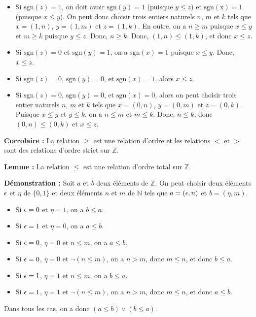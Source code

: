 \begin{itemize}[nosep]
\begin{itemize}[nosep]
            \item Si $\mathrm{sgn}(z) = 1$, on doit avoir $\mathrm{sgn}(y) = 1$ (puisque $y \leq z$) et $\mathrm{sgn(x)} = 1$ (puisque $x \leq y$). 
                On peut donc choisir trois entiers naturels $n$, $m$ et $k$ tels que $x = (1,n)$, $y = (1,m)$ et $z = (1,k)$. 
                En outre, on a $n \geq m$ puisque $x \leq y$ et $m \geq k$ puisque $y \leq z$. 
                Donc, $n \geq k$. 
                Donc, $(1,n) \leq (1,k)$, et donc $x \leq z$.
            \item Si $\mathrm{sgn}(z) = 0$ et $\mathrm{sgn}(y) = 1$, on a $\mathrm{sgn}(x) = 1$ puisque $x \leq y$.
                Donc, $x \leq z$.
            \item Si $\mathrm{sgn}(z) = 0$, $\mathrm{sgn}(y) = 0$, et $\mathrm{sgn}(x) = 1$, alors $x \leq z$.
            \item Si $\mathrm{sgn}(z) = 0$, $\mathrm{sgn}(y) = 0$, et $\mathrm{sgn}(x) = 0$, alors on peut choisir trois entier naturels $n$, $m$ et $k$ tels que $x = (0,n)$, $y = (0,m)$ et $z = (0,k)$.
                Puisque $x \leq y$ et $y \leq k$, on a $n \leq m$ et $m \leq k$. 
                Donc, $n \leq k$, donc $(0,n) \leq (0,k)$ et $x \leq z$.
        \end{itemize}
\end{itemize}

\done

\medskip

\noindent\textbf{Corrolaire :} La relation $\geq$ est une relation d'ordre et les relations $<$ et $>$ sont des relations d'ordre strict sur $\mathbb{Z}$.

\medskip

\noindent\textbf{Lemme :} La relation $\leq$ est une relation d'ordre total sur $\mathbb{Z}$.

\medskip

\noindent\textbf{Démonstration :} Soit $a$ et $b$ deux éléments de $\mathbb{Z}$. 
    On peut choisir deux éléments $\epsilon$ et $\eta$ de $\lbrace 0, 1 \rbrace$ et deux éléments $n$ et $m$ de $\mathbb{N}$ tels que $a = (\epsilon, n)$ et $b = (\eta, m)$.
    \begin{itemize}[nosep]
        \item Si $\epsilon = 0$ et $\eta = 1$, on a $b \leq a$.
        \item Si $\epsilon = 1$ et $\eta = 0$, on a $a \leq b$.
        \item Si $\epsilon = 0$, $\eta = 0$ et $n \leq m$, on a $a \leq b$.
        \item Si $\epsilon = 0$, $\eta = 0$ et $\neg (n \leq m)$, on a $n > m$, donc $m \leq n$, et donc $b \leq a$.
        \item Si $\epsilon = 1$, $\eta = 1$ et $n \leq m$, on a $b \leq a$.
        \item Si $\epsilon = 1$, $\eta = 1$ et $\neg (n \leq m)$, on a $n > m$, donc $m \leq n$, et donc $a \leq b$.
    \end{itemize}
    Dans tous les cas, on a donc $(a \leq b) \vee (b \leq a)$.

